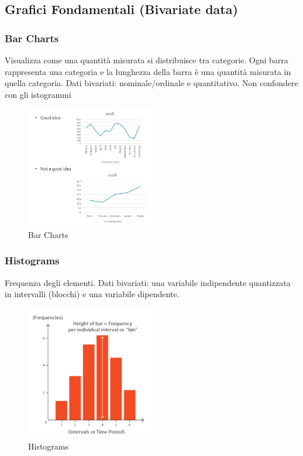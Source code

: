 \subsection{Grafici Fondamentali (Bivariate data)} %


\subsubsection{Bar Charts}
Visualizza come una quantità misurata si distribuisce tra categorie. Ogni barra rappresenta una categoria e la lunghezza della barra è una quantità misurata in quella categoria. Dati bivariati: nominale/ordinale e quantitativo.
 Non confondere con gli istogrammi
\begin{figure}[H]
    \centering
    \includegraphics[width=0.5\textwidth]{images/BarCharts.png} 
    \caption{Bar Charts}
    \label{fig:immagine}
\end{figure}
\subsubsection{Histograms}
Frequenza degli elementi. Dati bivariati: una variabile indipendente quantizzata in intervalli 
(blocchi) e una variabile dipendente.
\begin{figure}[H]
    \centering
    \includegraphics[width=0.5\textwidth]{images/Histograms.png} 
    \caption{Histograms}
    \label{fig:immagine}
\end{figure}

